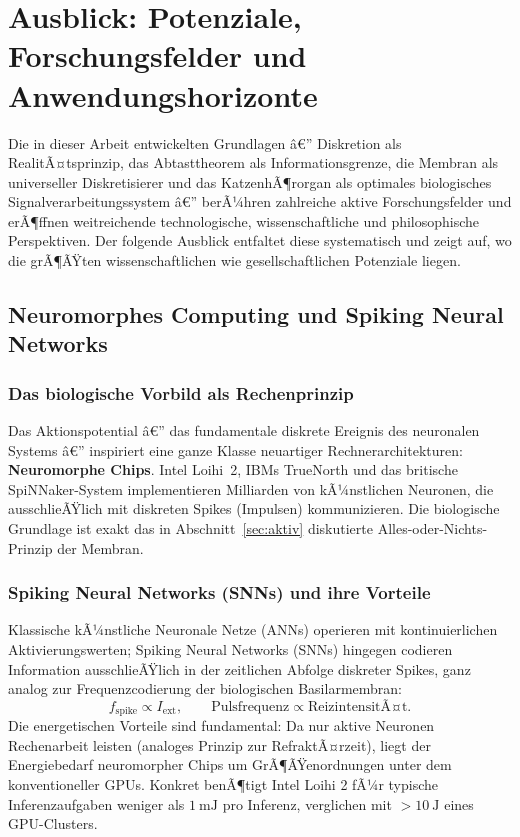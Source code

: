﻿\documentclass[12pt,a4paper,titlepage]{report}
\begin{document}
\chapter{Ausblick: Potenziale, Forschungsfelder und Anwendungshorizonte}

Die in dieser Arbeit entwickelten Grundlagen â€” Diskretion als RealitÃ¤tsprinzip, das
Abtasttheorem als Informationsgrenze, die Membran als universeller Diskretisierer und
das KatzenhÃ¶rorgan als optimales biologisches Signalverarbeitungssystem â€” berÃ¼hren
zahlreiche aktive Forschungsfelder und erÃ¶ffnen weitreichende technologische,
wissenschaftliche und philosophische Perspektiven. Der folgende Ausblick entfaltet diese
systematisch und zeigt auf, wo die grÃ¶ÃŸten wissenschaftlichen wie gesellschaftlichen
Potenziale liegen.

\section{Neuromorphes Computing und Spiking Neural Networks}

\subsection{Das biologische Vorbild als Rechenprinzip}

Das Aktionspotential â€” das fundamentale diskrete Ereignis des neuronalen Systems â€”
inspiriert eine ganze Klasse neuartiger Rechnerarchitekturen: \textbf{Neuromorphe
Chips}. Intel Loihi~2, IBMs TrueNorth und das britische SpiNNaker-System
implementieren Milliarden von kÃ¼nstlichen Neuronen, die ausschlieÃŸlich mit diskreten
Spikes (Impulsen) kommunizieren. Die biologische Grundlage ist exakt das in
Abschnitt~\ref{sec:aktiv} diskutierte Alles-oder-Nichts-Prinzip der Membran.

\subsection{Spiking Neural Networks (SNNs) und ihre Vorteile}

Klassische kÃ¼nstliche Neuronale Netze (ANNs) operieren mit kontinuierlichen
Aktivierungswerten; Spiking Neural Networks (SNNs) hingegen codieren Information
ausschlieÃŸlich in der zeitlichen Abfolge diskreter Spikes, ganz analog zur
Frequenzcodierung der biologischen Basilarmembran:
\[
    f_{\text{spike}} \propto I_{\text{ext}}, \qquad
    \text{Pulsfrequenz} \propto \text{ReizintensitÃ¤t.}
\]
Die energetischen Vorteile sind fundamental: Da nur aktive Neuronen Rechenarbeit leisten
(analoges Prinzip zur RefraktÃ¤rzeit), liegt der Energiebedarf
neuromorpher Chips um GrÃ¶ÃŸenordnungen unter dem konventioneller GPUs.
Konkret benÃ¶tigt Intel Loihi 2 fÃ¼r typische Inferenzaufgaben weniger als
$\SI{1}{\milli\joule}$ pro Inferenz, verglichen mit $>\SI{10}{\joule}$ eines
GPU-Clusters.
\end{document}
